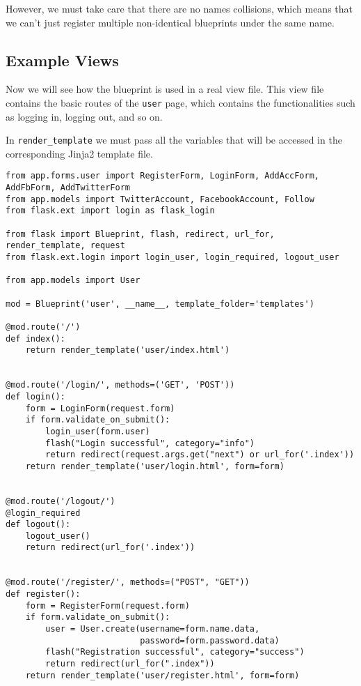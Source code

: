 \documentclass[../main/main.tex]{subfiles}
\begin{document}
However, we must take care that there are no names collisions, which
means that we can't just register multiple non-identical blueprints
under the same name. 

\subsection{Example Views}

Now we will see how the blueprint is used in a real view file. This view file
contains the basic routes of the \lstinline|user| page, which contains the
functionalities such as logging in, logging out, and so on.

In \lstinline|render_template| we must pass all the variables that will be
accessed in the corresponding Jinja2 template file. 

\begin{lstlisting}[caption=app/views/user.py, label=lst:data.py]
from app.forms.user import RegisterForm, LoginForm, AddAccForm, AddFbForm, AddTwitterForm
from app.models import TwitterAccount, FacebookAccount, Follow
from flask.ext import login as flask_login

from flask import Blueprint, flash, redirect, url_for, render_template, request
from flask.ext.login import login_user, login_required, logout_user

from app.models import User

mod = Blueprint('user', __name__, template_folder='templates')

@mod.route('/')
def index():
    return render_template('user/index.html')


@mod.route('/login/', methods=('GET', 'POST'))
def login():
    form = LoginForm(request.form)
    if form.validate_on_submit():
        login_user(form.user)
        flash("Login successful", category="info")
        return redirect(request.args.get("next") or url_for('.index'))
    return render_template('user/login.html', form=form)


@mod.route('/logout/')
@login_required
def logout():
    logout_user()
    return redirect(url_for('.index'))


@mod.route('/register/', methods=("POST", "GET"))
def register():
    form = RegisterForm(request.form)
    if form.validate_on_submit():
        user = User.create(username=form.name.data,
                           password=form.password.data)
        flash("Registration successful", category="success")
        return redirect(url_for(".index"))
    return render_template('user/register.html', form=form)
\end{lstlisting}
\end{document}
